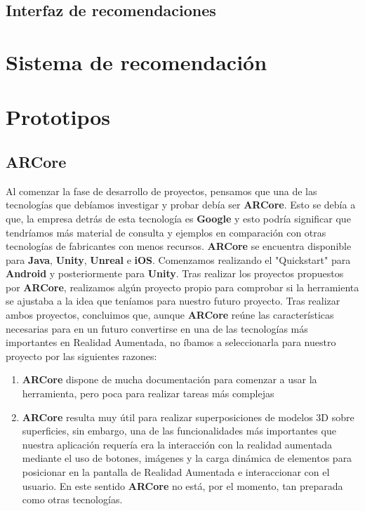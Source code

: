 \subsection{Interfaz de recomendaciones}
\label{makereference3.4.7}
\section{Sistema de recomendación}
\label{makereference3.5}

\section{Prototipos}
\label{makereference3.6}

\subsection{ARCore} 
\label{makereference3.6.1} 
\begin{flushleft}
    Al comenzar la fase de desarrollo de proyectos, pensamos que una de las tecnologías que debíamos 
    investigar y probar debía ser \textbf{ARCore}. Esto se debía a que, la empresa detrás de esta 
    tecnología es \textbf{Google} y esto podría significar que tendríamos más material de consulta 
    y ejemplos en comparación con otras tecnologías de fabricantes con menos recursos.
    \textbf{ARCore} se encuentra disponible para \textbf{Java}, \textbf{Unity}, \textbf{Unreal} e \textbf{iOS}. Comenzamos realizando el 
    "Quickstart" para \textbf{Android} y posteriormente para \textbf{Unity}. 
    Tras realizar los proyectos propuestos por \textbf{ARCore}, realizamos algún proyecto propio 
    para comprobar si la herramienta se ajustaba a la idea que teníamos para nuestro futuro proyecto.
    Tras realizar ambos proyectos, concluimos que, aunque \textbf{ARCore} reúne las características 
    necesarias para en un futuro convertirse en una de las tecnologías más importantes en Realidad Aumentada, 
    no íbamos a seleccionarla para nuestro proyecto por las siguientes razones:
    \begin{enumerate}
        \item \textbf{ARCore} dispone de mucha documentación para comenzar a usar la herramienta, pero poca para realizar tareas más complejas
        \item \textbf{ARCore} resulta muy útil para realizar superposiciones de modelos 3D sobre superficies, sin embargo, una de las funcionalidades más importantes que nuestra aplicación requería era la interacción con la realidad aumentada mediante el uso de botones, imágenes y la carga dinámica de elementos para posicionar en la pantalla de Realidad Aumentada e interaccionar con el usuario. En este sentido \textbf{ARCore} no está, por el momento, tan preparada como otras tecnologías.
    \end{enumerate}
    
\end{flushleft}
